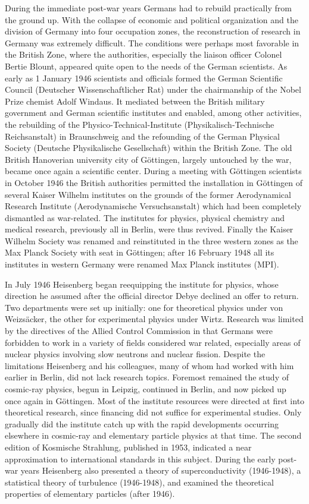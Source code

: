 \documentclass{article}
\begin{document}
During the immediate post-war years Germans had to rebuild practically from the ground up. With the collapse of economic and political organization and the division of Germany into four occupation zones, the reconstruction of research in Germany was extremely difficult. The conditions were perhaps most favorable in the British Zone, where the authorities, especially the liaison officer Colonel Bertie Blount, appeared quite open to the needs of the German scientists. As early as 1 January 1946 scientists and officials formed the German Scientific Council (Deutscher Wissenschaftlicher Rat) under the chairmanship of the Nobel Prize chemist Adolf Windaus. It mediated between the British military government and German scientific institutes and enabled, among other activities, the rebuilding of the Physico-Technical-Institute (Physikalisch-Technische Reichsanstalt) in Braunschweig and the refounding of the German Physical Society (Deutsche Physikalische Gesellschaft) within the British Zone. The old British Hanoverian university city of Göttingen, largely untouched by the war, became once again a scientific center. During a meeting with Göttingen scientists in October 1946 the British authorities permitted the installation in Göttingen of several Kaiser Wilhelm institutes on the grounds of the former Aerodynamical Research Institute (Aerodynamische Versuchsanstalt) which had been completely dismantled as war-related. The institutes for physics, physical chemistry and medical research, previously all in Berlin, were thus revived. Finally the Kaiser Wilhelm Society was renamed and reinstituted in the three western zones as the Max Planck Society with seat in Göttingen; after 16 February 1948 all its institutes in western Germany were renamed Max Planck institutes (MPI).

In July 1946 Heisenberg began reequipping the institute for physics, whose direction he assumed after the official director Debye declined an offer to return. Two departments were set up initially: one for theoretical physics under von Weizsäcker, the other for experimental physics under Wirtz. Research was limited by the directives of the Allied Control Commission in that Germans were forbidden to work in a variety of fields considered war related, especially areas of nuclear physics involving slow neutrons and nuclear fission. Despite the limitations Heisenberg and his colleagues, many of whom had worked with him earlier in Berlin, did not lack research topics. Foremost remained the study of cosmic-ray physics, begun in Leipzig, continued in Berlin, and now picked up once again in Göttingen. Most of the institute resources were directed at first into theoretical research, since financing did not suffice for experimental studies. Only gradually did the institute catch up with the rapid developments occurring elsewhere in cosmic-ray and elementary particle physics at that time. The second edition of Kosmische Strahlung, published in 1953, indicated a near approximation to international standards in this subject. During the early post-war years Heisenberg also presented a theory of superconductivity (1946-1948), a statistical theory of turbulence (1946-1948), and examined the theoretical properties of elementary particles (after 1946).
\end{document}
